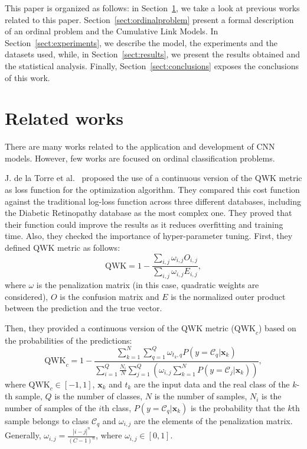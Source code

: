 \documentclass[journal]{IEEEtran}
\begin{document}
	This paper is organized as follows: in Section~\ref{sect:relatedwork}, we take a look at previous works related to this paper. Section~\ref{sect:ordinalproblem} present a formal description of an ordinal problem and the Cumulative Link Models. In Section~\ref{sect:experiments}, we describe the model, the experiments and the datasets used, while, in Section~\ref{sect:results}, we present the results obtained and the statistical analysis. Finally, Section~\ref{sect:conclusions} exposes the conclusions of this work.
	
	\section{Related works}
	\label{sect:relatedwork}
	There are many works related to the application and development of CNN models. However, few works are focused on ordinal classification problems.
	
	J. de la Torre et al.~\cite{de2018weighted} proposed the use of a continuous version of the QWK metric as loss function for the optimization algorithm. They compared this cost function against the traditional log-loss function across three different databases, including the Diabetic Retinopathy database as the most complex one. They proved that their function could improve the results as it reduces overfitting and training time. Also, they checked the importance of hyper-parameter tuning. First, they defined QWK metric as follows:
	\begin{equation}
	\text{QWK} = 1 - \frac{\sum\limits_{i,j} \omega_{i,j} O_{i,j}}{\sum\limits_{i,j} \omega_{i,j} E_{i,j}},
	\end{equation}
	where $\omega$ is the penalization matrix (in this case, quadratic weights are considered), $O$ is the confusion matrix and $E$ is the normalized outer product between the prediction and the true vector.
	
	Then, they provided a continuous version of the QWK metric ($\text{QWK}_c$) based on the probabilities of the predictions:
	\begin{equation}
	\text{QWK}_c = 1 - \frac{\sum\limits_{k=1}^N \sum\limits_{q=1}^Q \omega_{t_k, q} P(y = \mathcal{C}_q | \mathbf{x}_k)}{\sum\limits_{i=1}^Q \frac{N_i}{N} \sum\limits_{j=1}^Q ( \omega_{i,j} \sum\limits_{k=1}^N P(y = \mathcal{C}_j | \mathbf{x}_k))},
	\end{equation}
	where $\text{QWK}_c \in [-1,1]$, $\mathbf{x}_k$ and $t_k$ are the input data and the real class of the $k$-th sample, $Q$ is the number of classes, $N$ is the number of samples, $N_i$ is the number of samples of the $i$th class, $P(y = \mathcal{C}_q | \mathbf{x}_k)$ is the probability that the $k$th sample belongs to class $\mathcal{C}_q$ and $\omega_{i,j}$ are the elements of the penalization matrix. Generally, $\omega_{i,j} = \frac{|i-j|^n}{(C-1)^n}$, where $\omega_{i,j} \in [0,1]$.
	
\end{document}
